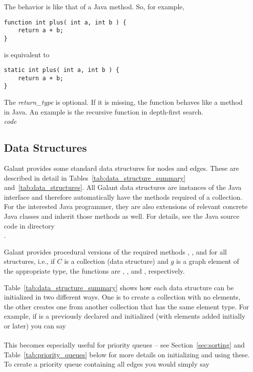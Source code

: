 The behavior is like that of a Java method. So, for example,
\begin{verbatim}
function int plus( int a, int b ) {
    return a + b;
}
\end{verbatim}
is equivalent to
\begin{verbatim}
static int plus( int a, int b ) {
    return a + b;
}
\end{verbatim}

The \textsl{return\_type} is optional. If it is missing, the function behaves like
a  method in Java. An example is the recursive function
 in depth-first search.
\\
 \textsl{code} \Code{\}}





\subsection{Data Structures} \label{sec:datastructures}

Galant provides some standard data structures for nodes and edges.
These are described in detail in Tables~\ref{tab:data_structure_summary}
and~\ref{tab:data_structures}.
All Galant data structures are instances of the Java 
interface and therefore automatically have the methods required of a
collection. For the interested Java programmer, they are also extensions of
relevant concrete Java classes and inherit those methods as well. For
details, see the Java source code in directory\\
.

Galant provides procedural versions of the required methods ,
,  and  for all structures, i.e., if $C$
is a collection (data structure) and $g$ is a graph element of the
appropriate type, the functions are , ,
 and , respectively.

Table~\ref{tab:data_structure_summary} shows how each data structure can be
initialized in two different ways. One is to create a collection with no
elements, the other creates one from another collection that has the same
element type. For example, if  is a previously declared and initialized
 (with elements added initially or later) you can say\\
\hspace*{1em}\\
This becomes especially useful for priority queues -- see
Section~\ref{sec:sorting} and Table~\ref{tab:priority_queues} below for more
details on initializing and using these.
To create a priority queue containing all edges you would simply say\\
\hspace*{1em}

